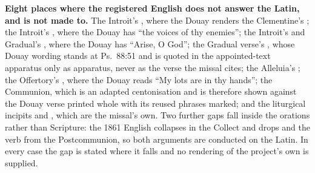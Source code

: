 \textbf{Eight places where the registered English does not answer the Latin,
and is not made to.} The Introit's , where the Douay
renders the Clementine's ; the Introit's , where the Douay has ``the voices of thy enemies''; the Introit's
and Gradual's , where the Douay has ``Arise, O God''; the
Gradual verse's , whose Douay
wording stands at Ps.~88:51 and is quoted in the appointed-text apparatus only
as apparatus, never as the verse the missal cites; the Alleluia's ; the Offertory's , where the Douay
reads ``My lots are in thy hands''; the Communion, which is an adapted
centonisation and is therefore shown against the Douay verse printed whole with
its reused phrases marked; and the liturgical incipits  and
, which are the missal's
own. Two further gaps fall inside the orations rather than Scripture: the 1861
English collapses  in the Collect and drops 
and the verb  from the Postcommunion, so both arguments are
conducted on the Latin. In every case the gap is stated where it falls and no
rendering of the project's own is supplied.

